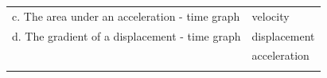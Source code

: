 \begin{enumerate}[noitemsep, label=\textbf{\arabic*}. ]
{\begin{tabular}[t]{|l|l|}
    
        c. The area under an acceleration - time graph &
    
    
        velocity%
     \tabularnewline\cline{1-1}\cline{2-2}
    
    
        d. The gradient of a displacement - time graph &
    
    
        displacement%
     \tabularnewline\cline{1-1}\cline{2-2}
    
    
         &
    
    
        acceleration%
     \tabularnewline\cline{1-1}\cline{2-2}
    
    
         &
    
    

\end{tabular}}
\end{enumerate}

